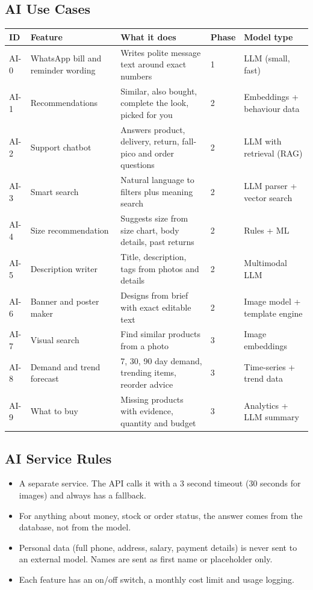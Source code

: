 \documentclass[11pt,a4paper]{article}
\newcommand{\hdr}{\rowcolor{hdrgray}\bfseries}
\begin{document}
\subsection{AI Use Cases}
\begin{longtable}{L{1.3cm}L{3.2cm}L{6.4cm}L{1.2cm}L{4.4cm}}
\hdr ID & Feature & What it does & Phase & Model type \\ \endhead
AI-0 & WhatsApp bill and reminder wording & Writes polite message text around exact numbers & 1 & LLM (small, fast) \\
AI-1 & Recommendations & Similar, also bought, complete the look, picked for you & 2 & Embeddings + behaviour data \\
AI-2 & Support chatbot & Answers product, delivery, return, fall-pico and order questions & 2 & LLM with retrieval (RAG) \\
AI-3 & Smart search & Natural language to filters plus meaning search & 2 & LLM parser + vector search \\
AI-4 & Size recommendation & Suggests size from size chart, body details, past returns & 2 & Rules + ML \\
AI-5 & Description writer & Title, description, tags from photos and details & 2 & Multimodal LLM \\
AI-6 & Banner and poster maker & Designs from brief with exact editable text & 2 & Image model + template engine \\
AI-7 & Visual search & Find similar products from a photo & 3 & Image embeddings \\
AI-8 & Demand and trend forecast & 7, 30, 90 day demand, trending items, reorder advice & 3 & Time-series + trend data \\
AI-9 & What to buy & Missing products with evidence, quantity and budget & 3 & Analytics + LLM summary \\
\end{longtable}

\subsection{AI Service Rules}
\begin{itemize}
\item A separate service. The API calls it with a 3 second timeout (30 seconds for images) and always has a fallback.
\item For anything about money, stock or order status, the answer comes from the database, not from the model.
\item Personal data (full phone, address, salary, payment details) is never sent to an external model. Names are sent as first name or placeholder only.
\item Each feature has an on/off switch, a monthly cost limit and usage logging.
\end{itemize}
\end{document}
